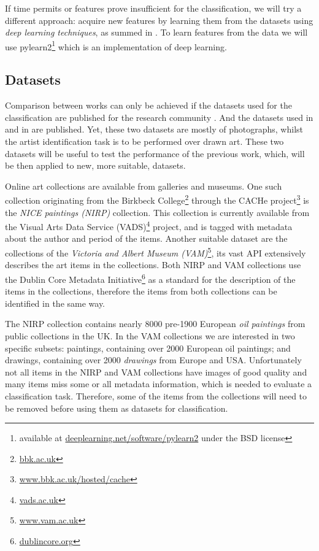 \documentclass[a4paper,twocolumn]{article}
\begin{document}
If time permits or features prove insufficient for the classification, we will
try a different approach:  acquire new features by learning them from the
datasets using \emph{deep learning techniques}, as summed in
\cite{antes13deep}.  To learn features from the data we will use
pylearn2\footnote{available at
\href{http://deeplearning.net/software/pylearn2/}
{deeplearning.net/software/pylearn2} under the BSD license} which is an
implementation of deep learning.

\subsection{Datasets}
\label{datasets}

Comparison between works can only be achieved if the datasets used for the
classification are published for the research community \cite{mach10clas}.  And
the datasets used in \cite{mach10clas} and in \cite{jma12clas} are published.
Yet, these two datasets are mostly of photographs, whilst the artist
identification task is to be performed over drawn art.  These two datasets will
be useful to test the performance of the previous work, which, will be then
applied to new, more suitable, datasets.

Online art collections are available from galleries and museums.  One such
collection originating from the Birkbeck College\footnote{
\href{http://www.bbk.ac.uk}{bbk.ac.uk}} through the CACHe project\footnote{
\href{http://www.bbk.ac.uk/hosted/cache/}{www.bbk.ac.uk/hosted/cache}} is the
\emph{NICE paintings (NIRP)} collection.  This collection is currently
available from the Visual Arts Data Service (VADS)\footnote{
\href{http://vads.ac.uk/}{vads.ac.uk}} project, and is tagged with metadata
about the author and period of the items.  Another suitable dataset are the
collections of the \emph{Victoria and Albert Museum (VAM)}\footnote{
\href{http://www.vam.ac.uk/}{www.vam.ac.uk}}, its vast API extensively
describes the art items in the collections.  Both NIRP and VAM collections use
the Dublin Core Metadata Initiative\footnote{
\href{http://dublincore.org/}{dublincore.org}} as a standard for the
description of the items in the collections, therefore the items from both
collections can be identified in the same way.

The NIRP collection contains nearly 8000 pre-1900 European \emph{oil paintings}
from public collections in the UK.  In the VAM collections we are interested in
two specific subsets: paintings, containing over 2000 European oil paintings;
and drawings, containing over 2000 \emph{drawings} from Europe and USA.
Unfortunately not all items in the NIRP and VAM collections have images of good
quality and many items miss some or all metadata information, which is needed
to evaluate a classification task.  Therefore, some of the items from the
collections will need to be removed before using them as datasets for
classification.
\end{document}
